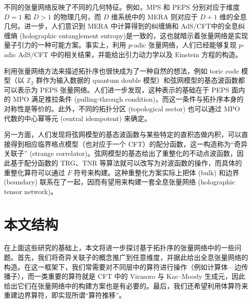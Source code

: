 不同的张量网络反映了不同的几何特征。例如，MPS 和 PEPS 分别对应于维度 $D=1$ 和 $D>1$ 的物理几何，而 $D$ 维系统中的 MERA 则对应于 $D+1$ 维的全息几何\cite{evenbly2011tensor}。进一步，人们意识到 MERA 中计算得到的纠缠熵和 AdS/CFT\cite{maldacena1999large}中的全息纠缠熵 (holographic entanglement entropy)\cite{ryu2006holographic}是一致的\cite{swingle2012entanglement,swingle2012constructing}，这也就暗示着张量网络是实现量子引力的一种可能方案。事实上，利用 $p$-adic 张量网络，人们已经能够复现 $p$-adic AdS/CFT 中的相关结果\cite{bhattacharyya2018tensor,hung2019padic}，并能给出引力动力学以及 Einstein 方程的构造\cite{chen2021emergent}。

利用张量网络方法来描述拓扑序也很快成为了一种自然的想法，例如 toric code 模型（以 $\mathbb{Z}_2$ 群作为输入数据的 quantum double 模型）和弦网模型的基态波函数都可以表示为 PEPS 张量网络\cite{verstraete2006criticality,gu2009tensor2,buerschaper2009explicit,luo2017structure}。人们进一步发现，这种表示的基础在于 PEPS 面内的 MPO 满足推拉条件 (pulling-through condition)，而这一条件与拓扑序本身的对称性是等价的\cite{bultinck2017anyons,sahinoglu2021characterizing}。此外，不同的拓扑分区 (topological sector) 也可以通过 MPO 代数的中心幂等元 (central idempotent) 来确定\cite{bultinck2017anyons,vanhove2018mapping,aasen2020topological}。

另一方面，人们发现将弦网模型的基态波函数与某些特定的直积态做内积，可以直接得到相应临界格点模型（也对应于一个 CFT）的配分函数，这一构造称为“奇异关联子” (strange correlator)\cite{you2014wave,vanhove2018mapping,lootens2019cardy,aasen2020topological,vanhove2022topological}。弦网模型的基态给出了重整化的不动点波函数\cite{konig2009exact,konig2010quantum}，因此基于配分函数的 TRG、TNR 等算法就可以改写为对波函数的操作，而具体的重整化算符可以通过 $F$ 符号来构建。这种重整化方案实际上把体 (bulk) 和边界 (boundary) 联系在了一起，因而有望用来构建一套全息张量网络 (holographic tensor network)。

\section{本文结构}

在上面这些研究的基础上，本文将进一步探讨基于拓扑序的张量网络中的一些问题。首先，我们将奇异关联子的概念推广到任意维度，并据此给出全息张量网络的构造。在这一框架下，我们常需要对不同层中的算符进行操作（例如计算体—边传播子），而一类重要的算符就是 CFT 中的 Virasoro 与 Kac--Moody 生成元，因此给出它们在张量网络中的构建方案也是有必要的。最后，我们还希望利用体算符来重建边界算符，即实现所谓“算符推移”。

